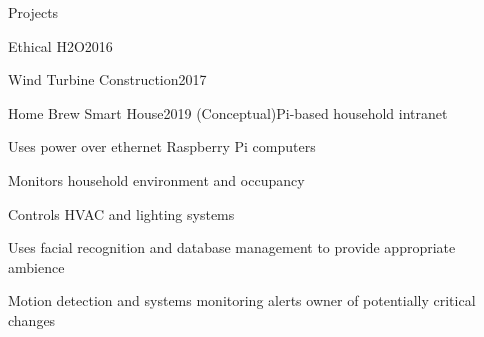 \documentclass{resume} %
\begin{document}
\begin{rSection}{Projects}

\begin{rWorkSubsection}{Ethical H2O}{2016}{}{}
\item 
\end{rWorkSubsection}\vspace{-0.5em}


\begin{rWorkSubsection}{Wind Turbine Construction}{2017}{}{}
\item 
\end{rWorkSubsection}\vspace{-0.5em}


\begin{rWorkSubsection}{Home Brew Smart House}{2019 (Conceptual)}{Pi-based household intranet}{}
\item Uses power over ethernet Raspberry Pi computers
\item Monitors household environment and occupancy
\item Controls HVAC and lighting systems
\item Uses facial recognition and database management to provide appropriate ambience
\item Motion detection and systems monitoring alerts owner of potentially critical changes
\end{rWorkSubsection}\vspace{-0.5em}
\fi

\end{rSection}

\end{document}
